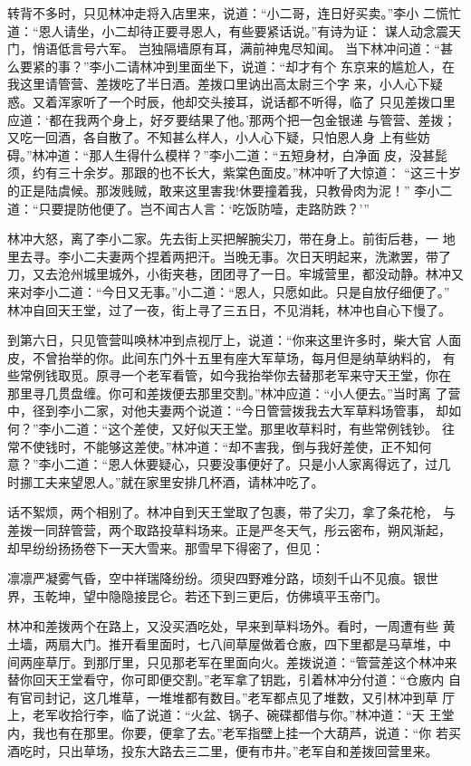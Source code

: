 转背不多时，只见林冲走将入店里来，说道：“小二哥，连日好买卖。”李小
二慌忙道：“恩人请坐，小二却待正要寻恩人，有些要紧话说。”有诗为证：
谋人动念震天门，悄语低言号六军。
岂独隔墙原有耳，满前神鬼尽知闻。
当下林冲问道：“甚么要紧的事？”李小二请林冲到里面坐下，说道：“却才有个
东京来的尴尬人，在我这里请管营、差拨吃了半日酒。差拨口里讷出高太尉三个字
来，小人心下疑惑。又着浑家听了一个时辰，他却交头接耳，说话都不听得，临了
只见差拨口里应道：‘都在我两个身上，好歹要结果了他。’那两个把一包金银递
与管营、差拨；又吃一回酒，各自散了。不知甚么样人，小人心下疑，只怕恩人身
上有些妨碍。”林冲道：“那人生得什么模样？”李小二道：“五短身材，白净面
皮，没甚髭须，约有三十余岁。那跟的也不长大，紫棠色面皮。”林冲听了大惊道：
“这三十岁的正是陆虞候。那泼贱贼，敢来这里害我!休要撞着我，只教骨肉为泥！”
李小二道：“只要提防他便了。岂不闻古人言：‘吃饭防噎，走路防跌？’”

林冲大怒，离了李小二家。先去街上买把解腕尖刀，带在身上。前街后巷，一
地里去寻。李小二夫妻两个捏着两把汗。当晚无事。次日天明起来，洗漱罢，带了
刀，又去沧州城里城外，小街夹巷，团团寻了一日。牢城营里，都没动静。林冲又
来对李小二道：“今日又无事。”小二道：“恩人，只愿如此。只是自放仔细便了。”
林冲自回天王堂，过了一夜，街上寻了三五日，不见消耗，林冲也自心下慢了。

到第六日，只见管营叫唤林冲到点视厅上，说道：“你来这里许多时，柴大官
人面皮，不曾抬举的你。此间东门外十五里有座大军草场，每月但是纳草纳料的，
有些常例钱取觅。原寻一个老军看管，如今我抬举你去替那老军来守天王堂，你在
那里寻几贯盘缠。你可和差拨便去那里交割。”林冲应道：“小人便去。”当时离
了营中，径到李小二家，对他夫妻两个说道：“今日管营拨我去大军草料场管事，
却如何？”李小二道：“这个差使，又好似天王堂。那里收草料时，有些常例钱钞。
往常不使钱时，不能够这差使。”林冲道：“却不害我，倒与我好差使，正不知何
意？”李小二道：“恩人休要疑心，只要没事便好了。只是小人家离得远了，过几
时挪工夫来望恩人。”就在家里安排几杯酒，请林冲吃了。

话不絮烦，两个相别了。林冲自到天王堂取了包裹，带了尖刀，拿了条花枪，
与差拨一同辞管营，两个取路投草料场来。正是严冬天气，彤云密布，朔风渐起，
却早纷纷扬扬卷下一天大雪来。那雪早下得密了，但见：

凛凛严凝雾气昏，空中祥瑞降纷纷。须臾四野难分路，顷刻千山不见痕。银世
界，玉乾坤，望中隐隐接昆仑。若还下到三更后，仿佛填平玉帝门。

林冲和差拨两个在路上，又没买酒吃处，早来到草料场外。看时，一周遭有些
黄土墙，两扇大门。推开看里面时，七八间草屋做着仓廒，四下里都是马草堆，中
间两座草厅。到那厅里，只见那老军在里面向火。差拨说道：“管营差这个林冲来
替你回天王堂看守，你可即便交割。”老军拿了钥匙，引着林冲分付道：“仓廒内
自有官司封记，这几堆草，一堆堆都有数目。”老军都点见了堆数，又引林冲到草
厅上，老军收拾行李，临了说道：“火盆、锅子、碗碟都借与你。”林冲道：“天
王堂内，我也有在那里。你要，便拿了去。”老军指壁上挂一个大葫芦，说道：“你
若买酒吃时，只出草场，投东大路去三二里，便有市井。”老军自和差拨回营里来。

